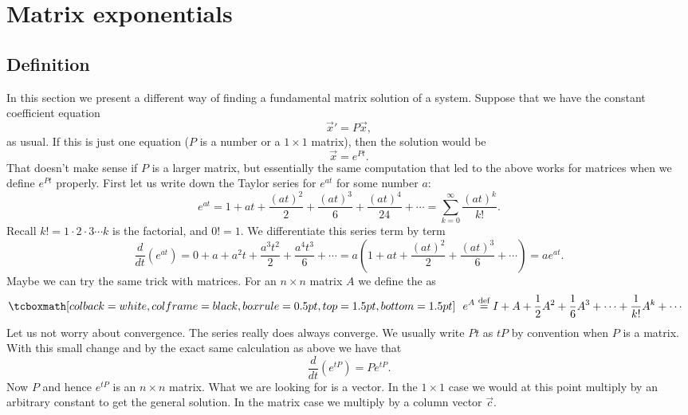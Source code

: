 
\sectionnewpage
\section{Matrix exponentials} \label{sec:matexp}


\subsection{Definition}

In this section we present a different way of finding a fundamental
matrix solution of a system.  Suppose that we have the constant
coefficient equation
\begin{equation*}
{\vec{x}}' = P \vec{x} ,
\end{equation*}
as usual.  If this is just one equation ($P$ is a number or a $1
\times 1$ matrix), then the solution would be
\begin{equation*}
\vec{x} = e^{Pt} .
\end{equation*}
That doesn't make sense if $P$ is a larger matrix, but
essentially the same computation that led to the above
works for matrices when we define
$e^{Pt}$ properly.  First let us write down the Taylor series for $e^{at}$
for some number $a$:
\begin{equation*}
e^{at} = 1 + at
+ \frac{{(at)}^2}{2}
+ \frac{{(at)}^3}{6}
+ \frac{{(at)}^4}{24}
+ \cdots
= \sum_{k=0}^\infty \frac{{(at)}^k}{k!} .
\end{equation*}
Recall $k! = 1 \cdot 2 \cdot 3 \cdots k$ is the factorial, and $0! = 1$.
We differentiate this series term by term
\begin{equation*}
\frac{d}{dt} \left(e^{at} \right) = 
0
+ a
+ a^2 t
+ \frac{a^3t^2}{2}
+ \frac{a^4t^3}{6}
+ \cdots
= a \left(
1
+ a t
+ \frac{{(at)}^2}{2}
+ \frac{{(at)}^3}{6}
+ \cdots \right)
= a e^{at}.
\end{equation*}
Maybe we can try the same trick with matrices.  For an $n \times n$
matrix $A$ we define the
\emph{} as
\begin{equation*}
\mybxbg{~~
e^A \overset{\text{def}}{=} I + A + \frac{1}{2} A^2 + 
\frac{1}{6} A^3 + \cdots + \frac{1}{k!} A^k + \cdots
~~}
\end{equation*}
Let us not worry about convergence.  The series really does
always converge.
We usually write $Pt$ as $tP$ by convention when $P$ is a matrix.
With this small change and by the exact same
calculation as above
we have that
\begin{equation*}
\frac{d}{dt} \left(e^{tP} \right) = 
P e^{tP} .
\end{equation*}
Now $P$ and hence $e^{tP}$ is an $n \times n$ matrix.  What we are looking
for is a vector.  In the $1 \times 1$ case we would at this
point multiply by an arbitrary constant to get the general solution.  In the
matrix case we multiply by a column vector $\vec{c}$.

